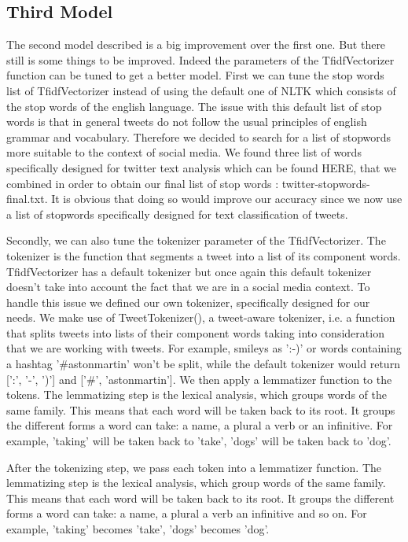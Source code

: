 \documentclass[10pt,conference,compsocconf]{IEEEtran}
\begin{document}
\subsection{Third Model}

The second model described is a big improvement over the first one. But there still is some things to be improved. Indeed the parameters  of the TfidfVectorizer function can be tuned to get a better model. First we can tune the stop words list of TfidfVectorizer instead of using the default one of NLTK which consists of the stop words of the english language. The issue with this default list of stop words is that in general tweets do not follow the usual principles of english grammar and vocabulary. Therefore we decided to search for a list of stopwords more suitable to the context of social media. We found three list of words specifically designed for twitter text analysis which can be found HERE, that we combined in order to obtain our final list of stop words : twitter-stopwords-final.txt. It is obvious that doing so would improve our accuracy since we now use a list of stopwords specifically designed for text classification of tweets.

Secondly, we can also tune the tokenizer parameter of the TfidfVectorizer. The tokenizer is the function that segments a tweet into a list of its component words. TfidfVectorizer has a default tokenizer but once again this default tokenizer doesn't take into account the fact that we are in a social media context. To handle this issue we defined our own tokenizer, specifically designed for our needs. We make use of TweetTokenizer(), a tweet-aware tokenizer, i.e. a function that splits tweets into lists of their component words taking into consideration that we are working with tweets. For example, smileys as ':-)' or words containing a hashtag '\#astonmartin' won't be split, while the default tokenizer would return [':', '-', ')'] and ['\#', 'astonmartin']. We then apply a lemmatizer function to the tokens. The lemmatizing step is the lexical analysis, which groups words of the same family. This means that each word will be taken back to its root. It groups the different forms a word can take: a name, a plural a verb or an infinitive. For example, 'taking' will be taken back to 'take', 'dogs' will be taken back to 'dog'.

After the tokenizing step, we pass each token into a lemmatizer function. The lemmatizing step is the lexical analysis, which group words of the same family. This means that each word will be taken back to its root. It groups the different forms a word can take: a name, a plural a verb an infinitive and so on. For example, 'taking' becomes 'take', 'dogs' becomes 'dog'.
\end{document}
